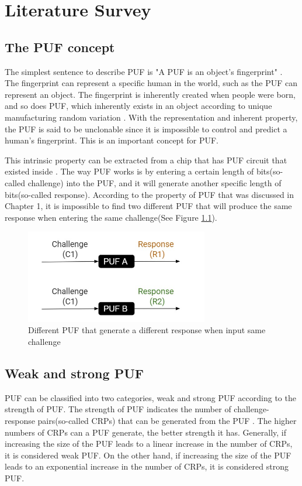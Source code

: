 \chapter{Literature Survey}

\section{The PUF concept}
The simplest sentence to describe PUF is "A PUF is an object's fingerprint" \cite{Reference4}. The fingerprint can represent a specific human in the world, such as the PUF can represent
an object. The fingerprint is inherently created when people were born, and so does PUF, which inherently exists in an object according to unique manufacturing random variation \cite{Reference4}.
With the representation and inherent property, the PUF is said to be unclonable since it is impossible to control and predict a human's fingerprint. This is an important concept for PUF. \par

This intrinsic property can be extracted from a chip that has PUF circuit that existed inside \cite{Reference2}. The way PUF works is by entering a certain length of bits(so-called challenge) into the PUF, and it will
generate another specific length of bits(so-called response). According to the property of PUF that was discussed in Chapter 1, it is impossible to find two different PUF that will produce the same response when entering the same challenge(See Figure \ref{fig:figure1}).
\begin{figure}[htp]
\centering
\includegraphics[width=8cm]{figures/figure1.jpg}
\caption{Different PUF that generate a different response when input same challenge}
\label{fig:figure1}
\end{figure}

\section{Weak and strong PUF}
PUF can be classified into two categories, weak and strong PUF according to the strength of PUF. The strength of PUF indicates the number of challenge-response pairs(so-called CRPs) that can be generated 
from the PUF \cite{Reference1}. The higher numbers of CRPs can a PUF generate, the better strength it has. Generally, if increasing the size of the PUF leads to a linear increase in the number of CRPs, it is considered weak PUF. 
On the other hand, if increasing the size of the PUF leads to an exponential increase in the number of CRPs, it is considered strong PUF.\par

